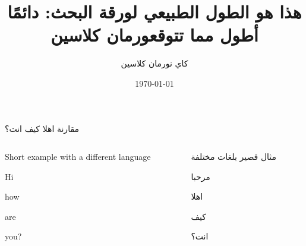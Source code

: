 \documentclass[aspectratio=169]{beamer}
\title[عنوان قصير]{هذا هو الطول الطبيعي لورقة البحث:
دائمًا أطول مما تتوقعورمان كلاسين}
\institute{اسم المعهد}
\author{كاي نورمان كلاسين}
\date{\today}
\begin{document}
\maketitle

\begin{frame}{مقارنة}
  اهلا كيف انت؟
  \begin{columns}[T]
    \begin{column}{.49\linewidth}
      \begin{vfilleditems}
        \item Short example with a different language
        \item Hi
        \item how
        \item are
        \item you?
      \end{vfilleditems}
    \end{column}
    \begin{column}{.49\linewidth}

      \begin{vfilleditems}
        \item مثال قصير بلغات مختلفة
        \item مرحبا
        \item اهلا
        \item كيف
        \item انت؟
      \end{vfilleditems}
    \end{column}
  \end{columns}
\end{frame}
\end{document}
